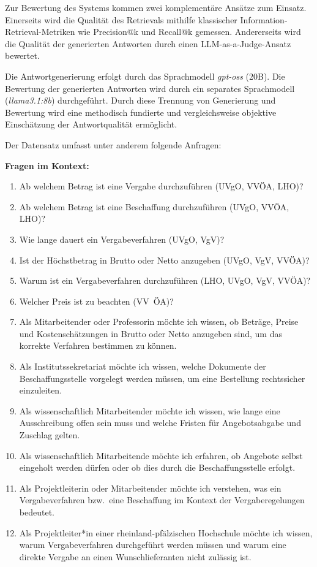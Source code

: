 Zur Bewertung des Systems kommen zwei komplementäre Ansätze zum Einsatz. Einerseits wird die Qualität des Retrievals mithilfe klassischer Information-Retrieval-Metriken wie Precision@k und Recall@k gemessen. Andererseits wird die Qualität der generierten Antworten durch einen LLM-as-a-Judge-Ansatz bewertet.

Die Antwortgenerierung erfolgt durch das Sprachmodell \textit{gpt-oss} (20B). Die Bewertung der generierten Antworten wird durch ein separates Sprachmodell (\textit{llama3.1:8b}) durchgeführt. Durch diese Trennung von Generierung und Bewertung wird eine methodisch fundierte und vergleichsweise objektive Einschätzung der Antwortqualität ermöglicht.

Der Datensatz umfasst unter anderem folgende Anfragen:

\textbf{Fragen im Kontext:}
\begin{enumerate}
    \item Ab welchem Betrag ist eine Vergabe durchzuführen (UVgO, VVÖA, LHO)?
    \item Ab welchem Betrag ist eine Beschaffung durchzuführen (UVgO, VVÖA, LHO)?
    \item Wie lange dauert ein Vergabeverfahren (UVgO, VgV)?
    \item Ist der Höchstbetrag in Brutto oder Netto anzugeben (UVgO, VgV, VVÖA)?
    \item Warum ist ein Vergabeverfahren durchzuführen (LHO, UVgO, VgV, VVÖA)?
    \item Welcher Preis ist zu beachten (VV~ÖA)?
    \item Als Mitarbeitender oder Professorin möchte ich wissen, ob Beträge, Preise und Kostenschätzungen in Brutto oder Netto anzugeben sind, um das korrekte Verfahren bestimmen zu können.
    \item Als Institutssekretariat möchte ich wissen, welche Dokumente der Beschaffungsstelle vorgelegt werden müssen, um eine Bestellung rechtssicher einzuleiten.
    \item Als wissenschaftlich Mitarbeitender möchte ich wissen, wie lange eine Ausschreibung offen sein muss und welche Fristen für Angebotsabgabe und Zuschlag gelten.
    \item Als wissenschaftlich Mitarbeitende möchte ich erfahren, ob Angebote selbst eingeholt werden dürfen oder ob dies durch die Beschaffungsstelle erfolgt.
    \item Als Projektleiterin oder Mitarbeitender möchte ich verstehen, was ein Vergabeverfahren bzw.\ eine Beschaffung im Kontext der Vergaberegelungen bedeutet.
    \item Als Projektleiter*in einer rheinland-pfälzischen Hochschule möchte ich wissen, warum Vergabeverfahren durchgeführt werden müssen und warum eine direkte Vergabe an einen Wunschlieferanten nicht zulässig ist.
\end{enumerate}

